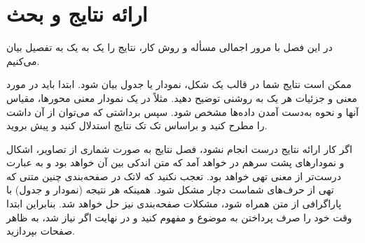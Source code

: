 \chapter{ارائه نتایج و بحث}
در این فصل با مرور اجمالی مسأله و روش کار، نتایج را یک به یک به تفصیل بیان می‌کنیم. 

ممکن است نتایج شما در قالب یک شکل، نمودار یا جدول بیان شود. ابتدا باید در مورد معنی و جزئیات هر یک به روشنی توضیح دهید. مثلاً در یک نمودار معنی محورها، مقیاس آنها و نحوه به‌دست آمدن داده‌ها مشخص شود. سپس برداشتی که می‌توان از آن داشت را مطرح کنید و براساس تک تک نتایج  استدلال کنید و پیش بروید.

اگر کار ارائه نتایج درست انجام نشود، فصل نتایج به صورت شماری از تصاویر، اشکال و نمودارهای پشت سرهم در خواهد آمد که متن اندکی بین آن خواهد بود و به عبارت درست‌تر از معنی تهی خواهد بود. تعجب نکنید که لاتک در صفحه‌بندی چنین متنی که تهی از حرف‌های شماست دچار مشکل شود. همینکه هر نتیجه (نمودار و جدول) با پاراگرافی از متن همراه شود، مشکلات صفحه‌بندی نیز حل خواهد شد. بنابراین ابتدا وقت خود را صرف پرداختن به موضوع و مفهوم کنید و در نهایت اگر نیاز شد، به ظاهر صفحات بپردازید.
